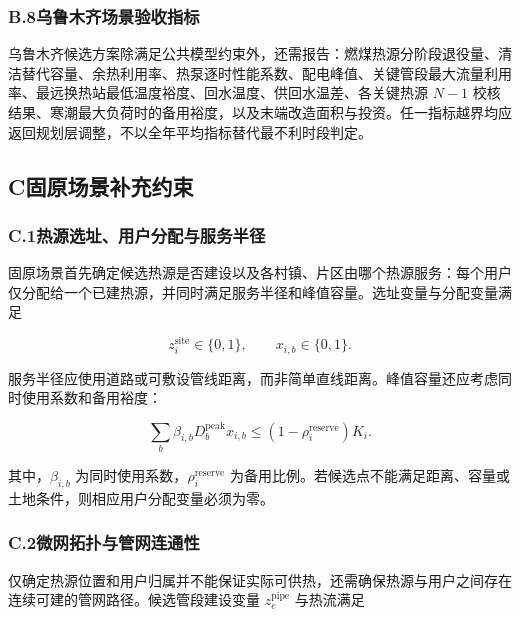 \subsubsection*{B.8\quad 乌鲁木齐场景验收指标}

乌鲁木齐候选方案除满足公共模型约束外，还需报告：燃煤热源分阶段退役量、清洁替代容量、余热利用率、热泵逐时性能系数、配电峰值、关键管段最大流量利用率、最远换热站最低温度裕度、回水温度、供回水温差、各关键热源 $N-1$ 校核结果、寒潮最大负荷时的备用裕度，以及末端改造面积与投资。任一指标越界均应返回规划层调整，不以全年平均指标替代最不利时段判定。

\clearpage

\subsection*{C\quad 固原场景补充约束}
\label{app:guyuan}

\subsubsection*{C.1\quad 热源选址、用户分配与服务半径}

固原场景首先确定候选热源是否建设以及各村镇、片区由哪个热源服务：每个用户仅分配给一个已建热源，并同时满足服务半径和峰值容量。选址变量与分配变量满足

\begin{equation}
z_i^{\mathrm{site}}\in\{0,1\},
\qquad
x_{i,b}\in\{0,1\}.
\label{eq:guyuan_binary}
\end{equation}

服务半径应使用道路或可敷设管线距离，而非简单直线距离。峰值容量还应考虑同时使用系数和备用裕度：

\begin{equation}
\sum_b\beta_{i,b}D_b^{\mathrm{peak}}x_{i,b}
\leq (1-\rho_i^{\mathrm{reserve}})K_i.
\label{eq:guyuan_peak_capacity}
\end{equation}

其中，$\beta_{i,b}$ 为同时使用系数，$\rho_i^{\mathrm{reserve}}$ 为备用比例。若候选点不能满足距离、容量或土地条件，则相应用户分配变量必须为零。

\subsubsection*{C.2\quad 微网拓扑与管网连通性}

仅确定热源位置和用户归属并不能保证实际可供热，还需确保热源与用户之间存在连续可建的管网路径。候选管段建设变量 $z_e^{\mathrm{pipe}}$ 与热流满足

